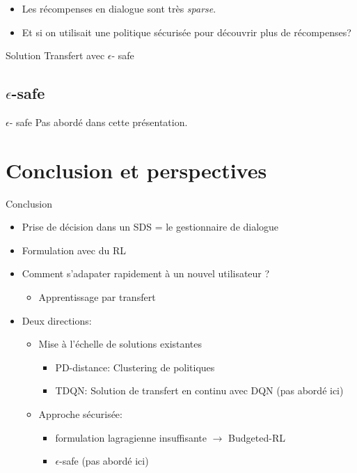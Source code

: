 \documentclass[french,handout]{beamer}
\begin{document}
    \begin{frame}

        \begin{itemize}
            \item Les récompenses en dialogue sont très \textit{sparse}.
            \item Et si on utilisait une politique sécurisée pour découvrir plus de récompenses?
        \end{itemize}

        \begin{exampleblock}{Solution}
            Transfert avec $\epsilon$- safe
        \end{exampleblock}
    \end{frame}
    \subsection{$\epsilon$-safe}
    \begin{frame}{$\epsilon$- safe}
        Pas abordé dans cette présentation.
    \end{frame}

    \section{Conclusion et perspectives}
    \begin{frame}{Conclusion}
        \begin{itemize}
            \item Prise de décision dans un SDS = le gestionnaire de dialogue
            \item Formulation avec du RL
            \item Comment s'adapater rapidement à un nouvel utilisateur ?
            \begin{itemize}
                \item Apprentissage par transfert
            \end{itemize}
            \item Deux directions:
            \begin{itemize}
                \item Mise à l'échelle de solutions existantes
                \begin{itemize}
                    \item PD-distance: Clustering de politiques
                    \item TDQN: Solution de transfert en continu avec DQN (pas abordé ici)
                \end{itemize}
                \item Approche sécurisée:
                \begin{itemize}
                    \item formulation lagragienne insuffisante $\rightarrow$ Budgeted-RL
                    \item $\epsilon$-safe (pas abordé ici)
                \end{itemize}
            \end{itemize}
        \end{itemize}
    \end{frame}
\end{document}
